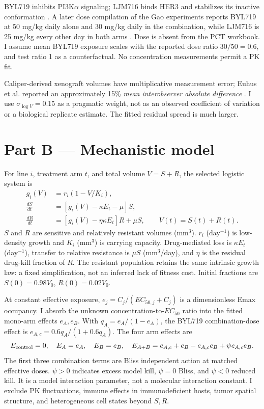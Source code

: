 \documentclass[10pt,a4paper]{article}
\begin{document}
BYL719 inhibits PI3K$\alpha$ signaling; LJM716 binds HER3 and stabilizes its inactive conformation \cite{garrett,garner}. A later dose compilation of the Gao experiments reports BYL719 at 50 mg/kg daily alone and 30 mg/kg daily in the combination, while LJM716 is 25 mg/kg every other day in both arms \cite{baaz}. Dose is absent from the PCT workbook. I assume mean BYL719 exposure scales with the reported dose ratio $30/50=0.6$, and test ratio 1 as a counterfactual. No concentration measurements permit a PK fit.

Caliper-derived xenograft volumes have multiplicative measurement error; Euhus et al. reported an approximately 15\% \emph{mean interobserver absolute difference} \cite{euhus}. I use $\sigma_{\log V}=0.15$ as a pragmatic weight, not as an observed coefficient of variation or a biological replicate estimate. The fitted residual spread is much larger.

\clearpage
\section*{Part B — Mechanistic model}
For line $i$, treatment arm $t$, and total volume $V=S+R$, the selected logistic system is
\begin{align}
g_i(V)&=r_i(1-V/K_i),\\
\frac{dS}{dt}&=[g_i(V)-\kappa E_t-\mu]S,\\
\frac{dR}{dt}&=[g_i(V)-\eta\kappa E_t]R+\mu S, \qquad V(t)=S(t)+R(t).
\end{align}
$S$ and $R$ are sensitive and relatively resistant volumes (mm$^3$). $r_i$ (day$^{-1}$) is low-density growth and $K_i$ (mm$^3$) is carrying capacity. Drug-mediated loss is $\kappa E_t$ (day$^{-1}$), transfer to relative resistance is $\mu S$ (mm$^3$/day), and $\eta$ is the residual drug-kill fraction of $R$. The resistant population retains the same intrinsic growth law: a fixed simplification, not an inferred lack of fitness cost. Initial fractions are $S(0)=0.98V_0$, $R(0)=0.02V_0$.

At constant effective exposure, $e_j=C_j/(EC_{50,j}+C_j)$ is a dimensionless Emax occupancy. I absorb the unknown concentration-to-$EC_{50}$ ratio into the fitted mono-arm effects $e_A,e_B$. With $q_A=e_A/(1-e_A)$, the BYL719 combination-dose effect is $e_{A,c}=0.6q_A/(1+0.6q_A)$. The four arm effects are
\begin{equation}
E_{\rm control}=0,\quad E_A=e_A,\quad E_B=e_B,\quad
E_{A+B}=e_{A,c}+e_B-e_{A,c}e_B+\psi e_{A,c}e_B.
\end{equation}
The first three combination terms are Bliss independent action at matched effective doses. $\psi>0$ indicates excess model kill, $\psi=0$ Bliss, and $\psi<0$ reduced kill. It is a model interaction parameter, not a molecular interaction constant. I exclude PK fluctuations, immune effects in immunodeficient hosts, tumor spatial structure, and heterogeneous cell states beyond $S,R$.
\end{document}
